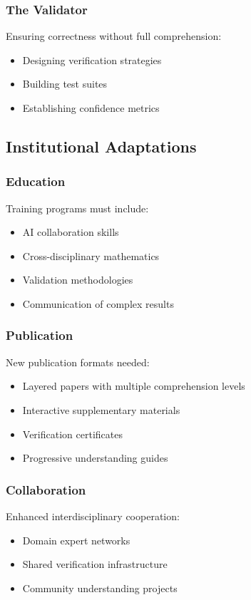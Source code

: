 \documentclass[11pt,a4paper]{article}
\begin{document}
\subsubsection{The Validator}
Ensuring correctness without full comprehension:
\begin{itemize}
\item Designing verification strategies
\item Building test suites
\item Establishing confidence metrics
\end{itemize}

\subsection{Institutional Adaptations}

\subsubsection{Education}
Training programs must include:
\begin{itemize}
\item AI collaboration skills
\item Cross-disciplinary mathematics
\item Validation methodologies
\item Communication of complex results
\end{itemize}

\subsubsection{Publication}
New publication formats needed:
\begin{itemize}
\item Layered papers with multiple comprehension levels
\item Interactive supplementary materials
\item Verification certificates
\item Progressive understanding guides
\end{itemize}

\subsubsection{Collaboration}
Enhanced interdisciplinary cooperation:
\begin{itemize}
\item Domain expert networks
\item Shared verification infrastructure
\item Community understanding projects
\end{itemize}
\end{document}
